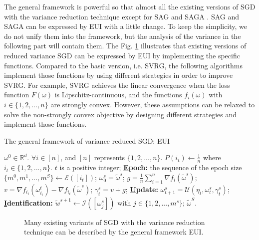 \documentclass[letterpaper]{article}
\begin{document}
The general framework is powerful so that almost all the existing versions of SGD with the variance reduction technique except for SAG \cite{Schmidt:2013ui} and SAGA \cite{Defazio:2014vu}. SAG and SAGA can be expressed by EUI with a little change. To keep the simplicity, we do not unify them into the framework, but the analysis of the variance in the following part will contain them. The Fig. \ref{figure_EUI_example} illustrates that existing versions of reduced variance SGD can be expressed by EUI by implementing the specific functions. Compared to the basic version, i.e. SVRG, the following algorithms implement those functions by using different strategies in order to improve SVRG. For example, SVRG achieves the linear convergence when the loss function $F(\omega)$ is Lipschitz-continuous, and the functions $f_i(\omega)$ with $i\in\{1,2,...,n\}$ are strongly convex. However, these assumptions can be relaxed to solve the non-strongly convex objective by designing different strategies and implement those functions. 

\begin{algorithm}[t]
    \caption{The general framework of variance reduced SGD: EUI}
    \label{algorithm_EUI}
    \begin{algorithmic}[1]
        \Require $\omega^0\in \mathbb{R}^d$. $\forall i\in[n]$, and $[n]$ represents $\{1,2, ..., n\}$.
        \State $P(i_t)\leftarrow \frac{1}{n}$ where $i_t \in \{1,2, ..., n\}$. $t$ is a positive integer;
        \State \textbf{\uline{E}poch:} the sequence of the epoch size $\{m^0, m^1, ..., m^S\}\leftarrow \mathcal{E}([i_t])$;
            \State $\omega_0^s=\tilde{\omega}^s$;
            \State $g=\frac{1}{n}\sum\limits_{i=1}^n\nabla f_i(\tilde{\omega}^s)$;
                \State  $v=\nabla f_{i_t}(\omega_{i_t}^t)-\nabla f_{i_t}(\tilde{\omega}^s)$;
                \State $\gamma_t^s=v+g$;
                \State \textbf{\uline{U}pdate:} $\omega_{t+1}^s=\mathcal{U}(\eta_t, \omega_t^s, \gamma_t^s)$;
            \EndFor
            \textbf{\uline{I}dentification:} $\tilde{w}^{s+1}\leftarrow\mathcal{I}([\omega_j^s])$ with $j\in\{1,2, ..., m^s\}$;
        \EndFor
        \Return $\tilde{\omega}^S$.
    \end{algorithmic}
\end{algorithm}

\begin{figure}
\centering
{}
\caption{Many existing variants of SGD with the variance reduction technique can be described by the general framework EUI.}
\label{figure_EUI_example}
\end{figure}
\end{document}
